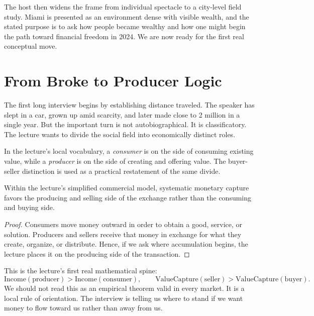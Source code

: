 The host then widens the frame from individual spectacle to a city-level field study. Miami is presented as an environment dense with visible wealth, and the stated purpose is to ask how people became wealthy and how one might begin the path toward financial freedom in 2024. We are now ready for the first real conceptual move.

\section{From Broke to Producer Logic}

The first long interview begins by establishing distance traveled. The speaker has slept in a car, grown up amid scarcity, and later made close to \text{\$}2 million in a single year. But the important turn is not autobiographical. It is classificatory. The lecture wants to divide the social field into economically distinct roles.

\begin{definition}
In the lecture's local vocabulary, a \emph{consumer} is on the side of consuming existing value, while a \emph{producer} is on the side of creating and offering value. The buyer-seller distinction is used as a practical restatement of the same divide.
\end{definition}

\begin{proposition}
Within the lecture's simplified commercial model, systematic monetary capture favors the producing and selling side of the exchange rather than the consuming and buying side.
\end{proposition}

\begin{proof}
Consumers move money outward in order to obtain a good, service, or solution. Producers and sellers receive that money in exchange for what they create, organize, or distribute. Hence, if we ask where accumulation begins, the lecture places it on the producing side of the transaction.
\end{proof}

This is the lecture's first real mathematical spine:
\begin{equation}
\mathrm{Income}(\mathrm{producer}) > \mathrm{Income}(\mathrm{consumer}),
\qquad
\mathrm{ValueCapture}(\mathrm{seller}) > \mathrm{ValueCapture}(\mathrm{buyer}).
\end{equation}
We should not read this as an empirical theorem valid in every market. It is a local rule of orientation. The interview is telling us where to stand if we want money to flow toward us rather than away from us.

